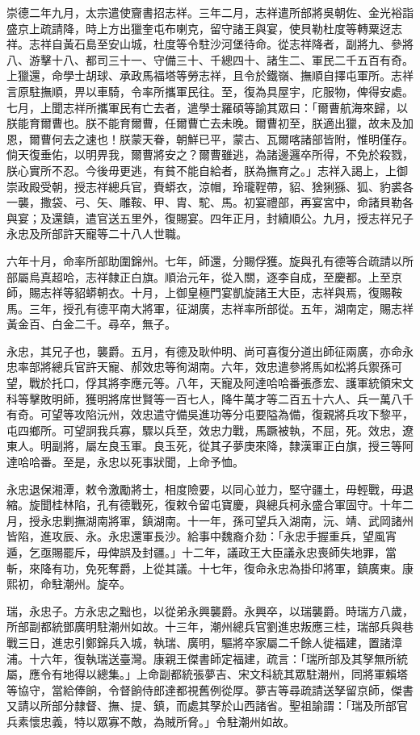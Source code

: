 \begin{pinyinscope}
崇德二年九月，太宗遣使齎書招志祥。三年二月，志祥遣所部將吳朝佐、金光裕詣盛京上疏請降，時上方出獵奎屯布喇克，留守諸王與宴，使貝勒杜度等轉粟迓志祥。志祥自黃石島至安山城，杜度等令駐沙河堡待命。從志祥降者，副將九、參將八、游擊十八、都司三十一、守備三十、千總四十、諸生二、軍民二千五百有奇。上獵還，命學士胡球、承政馬福塔等勞志祥，且令於鐵嶺、撫順自擇屯軍所。志祥言原駐撫順，畀以車騎，令率所攜軍民往。至，復為具屋宇，庀服物，俾得安處。七月，上聞志祥所攜軍民有亡去者，遣學士羅碩等諭其眾曰：「爾曹航海來歸，以朕能育爾曹也。朕不能育爾曹，任爾曹亡去未晚。爾曹初至，朕適出獵，故未及加恩，爾曹何去之速也！朕蒙天眷，朝鮮已平，蒙古、瓦爾喀諸部皆附，惟明僅存。倘天復垂佑，以明畀我，爾曹將安之？爾曹雖逃，為諸邊邏卒所得，不免於殺戮，朕心實所不忍。今後毋更逃，有貧不能自給者，朕為撫育之。」志祥入謁上，上御崇政殿受朝，授志祥總兵官，賚蟒衣，涼帽，玲瓏鞓帶，貂、猞猁猻、狐、豹裘各一襲，撒袋、弓、矢、雕鞍、甲、胄、駝、馬。初宴禮部，再宴宮中，命諸貝勒各與宴；及還鎮，遣官送五里外，復賜宴。四年正月，封續順公。九月，授志祥兄子永忠及所部許天寵等二十八人世職。

六年十月，命率所部助圍錦州。七年，師還，分賜俘獲。旋與孔有德等合疏請以所部屬烏真超哈，志祥隸正白旗。順治元年，從入關，逐李自成，至慶都。上至京師，賜志祥等貂蟒朝衣。十月，上御皇極門宴凱旋諸王大臣，志祥與焉，復賜鞍馬。三年，授孔有德平南大將軍，征湖廣，志祥率所部從。五年，湖南定，賜志祥黃金百、白金二千。尋卒，無子。

永忠，其兄子也，襲爵。五月，有德及耿仲明、尚可喜復分道出師征兩廣，亦命永忠率部將總兵官許天寵、郝效忠等徇湖南。六年，效忠遣參將馬如松將兵禦孫可望，戰於托口，俘其將李應元等。八年，天寵及阿達哈哈番張彥宏、護軍統領宋文科等擊敗明師，獲明將席世賢等一百七人，降牛萬才等二百五十六人、兵一萬八千有奇。可望等攻陷沅州，效忠遣守備吳進功等分屯要隘為備，復親將兵攻下黎平，屯四鄉所。可望詗我兵寡，驟以兵至，效忠力戰，馬蹶被執，不屈，死。效忠，遼東人。明副將，屬左良玉軍。良玉死，從其子夢庚來降，隸漢軍正白旗，授三等阿達哈哈番。至是，永忠以死事狀聞，上命予恤。

永忠退保湘潭，敕令激勵將士，相度險要，以同心並力，堅守疆土，毋輕戰，毋退縮。旋聞桂林陷，孔有德戰死，復敕令留屯寶慶，與總兵柯永盛合軍固守。十年二月，授永忠剿撫湖南將軍，鎮湖南。十一年，孫可望兵入湖南，沅、靖、武岡諸州皆陷，進攻辰、永。永忠還軍長沙。給事中魏裔介劾：「永忠手握重兵，望風宵遁，乞亟賜罷斥，毋俾誤及封疆。」十二年，議政王大臣議永忠喪師失地罪，當斬，來降有功，免死奪爵，上從其議。十七年，復命永忠為掛印將軍，鎮廣東。康熙初，命駐潮州。旋卒。

瑞，永忠子。方永忠之黜也，以從弟永興襲爵。永興卒，以瑞襲爵。時瑞方八歲，所部副都統鄧廣明駐潮州如故。十三年，潮州總兵官劉進忠叛應三桂，瑞部兵與巷戰三日，進忠引鄭錦兵入城，執瑞、廣明，驅將卒家屬二千餘人徙福建，置諸漳浦。十六年，復執瑞送臺灣。康親王傑書師定福建，疏言：「瑞所部及其孥無所統屬，應令有地得以總集。」上命副都統張夢吉、宋文科統其眾駐潮州，同將軍賴塔等協守，當給俸餉，令督餉侍郎達都視舊例從厚。夢吉等尋疏請送孥留京師，傑書又請以所部分隸督、撫、提、鎮，而處其孥於山西諸省。聖祖諭謂：「瑞及所部官兵素懷忠義，特以眾寡不敵，為賊所脅。」令駐潮州如故。


\end{pinyinscope}
